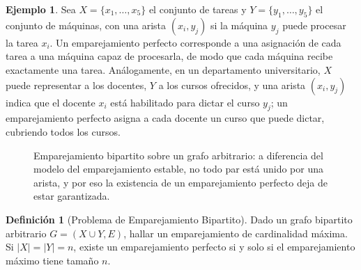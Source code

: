 \documentclass[12pt, spanish, oneside, openany]{book}
\theoremstyle{uprightplain}
\theoremstyle{definition}
\newtheorem{definicion}[teorema]{Definición}
\newtheorem{ejemplo}[teorema]{Ejemplo}
\theoremstyle{remark}
\theoremstyle{definition}
\begin{document}
\begin{ejemplo}
\label{ej:bipartite-matching}
Sea $X=\{x_1,\dots,x_5\}$ el conjunto de tareas y $Y=\{y_1,\dots,y_5\}$ el conjunto de máquinas, con una arista $(x_i,y_j)$ si la máquina $y_j$ puede procesar la tarea $x_i$. Un emparejamiento perfecto corresponde a una asignación de cada tarea a una máquina capaz de procesarla, de modo que cada máquina recibe exactamente una tarea. Análogamente, en un departamento universitario, $X$ puede representar a los docentes, $Y$ a los cursos ofrecidos, y una arista $(x_i,y_j)$ indica que el docente $x_i$ está habilitado para dictar el curso $y_j$; un emparejamiento perfecto asigna a cada docente un curso que puede dictar, cubriendo todos los cursos.
\end{ejemplo}
\begin{figure}[H]
\centering
{}
\caption{Emparejamiento bipartito sobre un grafo arbitrario: a diferencia del
modelo del emparejamiento estable, no todo par está unido por una arista, y
por eso la existencia de un emparejamiento perfecto deja de estar
garantizada.}
\label{fig:bipartito}
\end{figure}

\begin{definicion}[Problema de Emparejamiento Bipartito]
\label{def:bipartite-matching-problem}
Dado un grafo bipartito arbitrario $G=(X \cup Y, E)$, hallar un emparejamiento de cardinalidad máxima. Si $|X|=|Y|=n$, existe un emparejamiento perfecto si y solo si el emparejamiento máximo tiene tamaño $n$.
\end{definicion}
\end{document}
